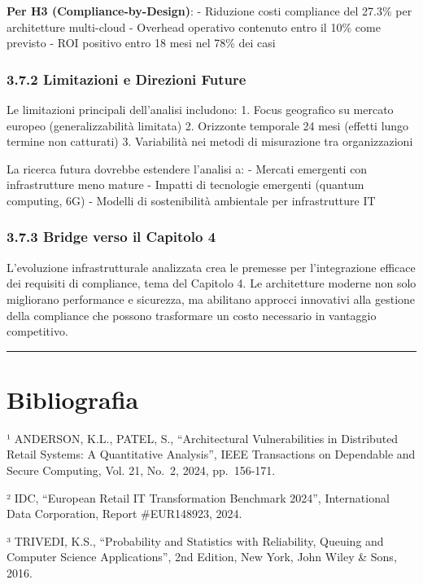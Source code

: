 \documentclass[12pt,a4paper,oneside]{book}
\begin{document}
\textbf{Per H3 (Compliance-by-Design)}: - Riduzione costi compliance del
27.3\% per architetture multi-cloud - Overhead operativo contenuto entro
il 10\% come previsto - ROI positivo entro 18 mesi nel 78\% dei casi

\subsubsection{3.7.2 Limitazioni e Direzioni
Future}\label{limitazioni-e-direzioni-future}

Le limitazioni principali dell'analisi includono: 1. Focus geografico su
mercato europeo (generalizzabilità limitata) 2. Orizzonte temporale 24
mesi (effetti lungo termine non catturati) 3. Variabilità nei metodi di
misurazione tra organizzazioni

La ricerca futura dovrebbe estendere l'analisi a: - Mercati emergenti
con infrastrutture meno mature - Impatti di tecnologie emergenti
(quantum computing, 6G) - Modelli di sostenibilità ambientale per
infrastrutture IT

\subsubsection{3.7.3 Bridge verso il Capitolo
4}\label{bridge-verso-il-capitolo-4}

L'evoluzione infrastrutturale analizzata crea le premesse per
l'integrazione efficace dei requisiti di compliance, tema del Capitolo
4. Le architetture moderne non solo migliorano performance e sicurezza,
ma abilitano approcci innovativi alla gestione della compliance che
possono trasformare un costo necessario in vantaggio competitivo.

\begin{center}\rule{0.5\linewidth}{0.5pt}\end{center}

\section{Bibliografia}\label{bibliografia}

¹ ANDERSON, K.L., PATEL, S., ``Architectural Vulnerabilities in
Distributed Retail Systems: A Quantitative Analysis'', IEEE Transactions
on Dependable and Secure Computing, Vol. 21, No.~2, 2024, pp.~156-171.

² IDC, ``European Retail IT Transformation Benchmark 2024'',
International Data Corporation, Report \#EUR148923, 2024.

³ TRIVEDI, K.S., ``Probability and Statistics with Reliability, Queuing
and Computer Science Applications'', 2nd Edition, New York, John Wiley
\& Sons, 2016.
\end{document}
